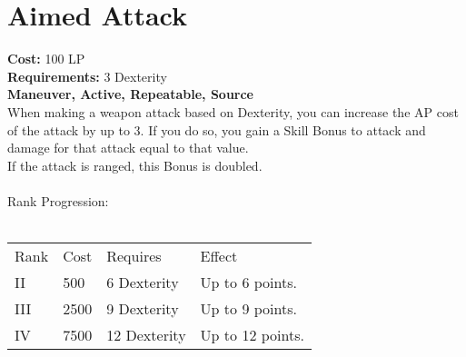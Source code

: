 \section{Aimed Attack}\label{maneuver:aimedAttack}
\textbf{Cost:} 100 LP\\
\textbf{Requirements:} 3 Dexterity\\
\textbf{Maneuver, Active, Repeatable, Source}\\
When making a weapon attack based on Dexterity, you can increase the AP cost of the attack by up to 3.
If you do so, you gain a Skill Bonus to attack and damage for that attack equal to that value.\\
If the attack is ranged, this Bonus is doubled.\\
\\
Rank Progression:\\
\\
\begin{tabular}{l | l | l | l}
	Rank & Cost & Requires & Effect\\
	II & 500 & 6 Dexterity & Up to 6 points.\\
	III & 2500 & 9 Dexterity & Up to 9 points.\\
	IV & 7500 & 12 Dexterity & Up to 12 points.\\
\end{tabular}